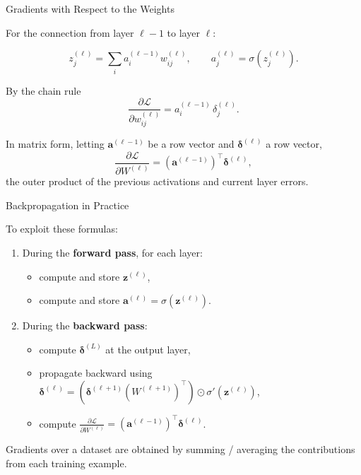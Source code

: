 \documentclass[aspectratio=169]{beamer}
\begin{document}
\begin{frame}{Gradients with Respect to the Weights}

For the connection from layer $\ell-1$ to layer $\ell$:

\[
  z^{(\ell)}_j = \sum_i a^{(\ell-1)}_i w^{(\ell)}_{ij},
  \qquad
  a^{(\ell)}_j = \sigma(z^{(\ell)}_j).
\]

By the chain rule
\[
  \frac{\partial \mathcal{L}}{\partial w^{(\ell)}_{ij}}
   = a^{(\ell-1)}_i\,\delta^{(\ell)}_j.
\]

\medskip

In matrix form, letting
$\bm{a}^{(\ell-1)}$ be a row vector and $\bm{\delta}^{(\ell)}$ a row
vector,
\[
  \frac{\partial \mathcal{L}}{\partial W^{(\ell)}}
   = (\bm{a}^{(\ell-1)})^\top \bm{\delta}^{(\ell)},
\]
the outer product of the previous activations and current layer errors.

\end{frame}

\begin{frame}{Backpropagation in Practice}

To exploit these formulas:

\begin{enumerate}
  \item During the \textbf{forward pass}, for each layer:
    \begin{itemize}
      \item compute and store $\bm{z}^{(\ell)}$,
      \item compute and store $\bm{a}^{(\ell)} = \sigma(\bm{z}^{(\ell)})$.
    \end{itemize}
  \item During the \textbf{backward pass}:
    \begin{itemize}
      \item compute $\bm{\delta}^{(L)}$ at the output layer,
      \item propagate backward using
        $\bm{\delta}^{(\ell)} =
           (\bm{\delta}^{(\ell+1)} (W^{(\ell+1)})^\top)
           \odot \sigma'(\bm{z}^{(\ell)})$,
      \item compute
        $\frac{\partial \mathcal{L}}{\partial W^{(\ell)}}
           = (\bm{a}^{(\ell-1)})^\top \bm{\delta}^{(\ell)}$.
    \end{itemize}
\end{enumerate}

Gradients over a dataset are obtained by summing / averaging the
contributions from each training example.

\end{frame}
\end{document}
